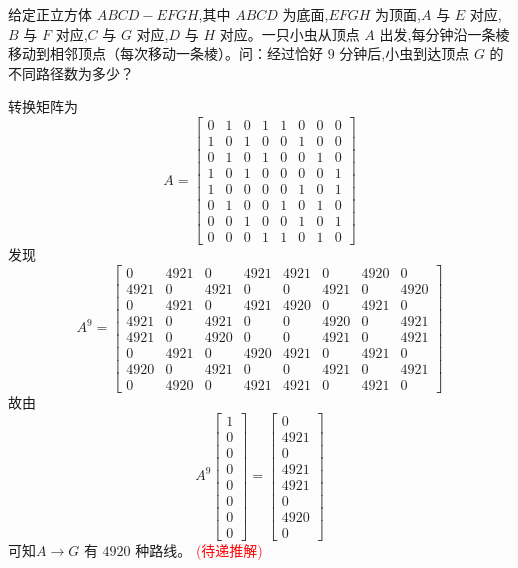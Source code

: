 \begin{questions}
    \question 给定正立方体 $ABCD-EFGH$,其中 $ABCD$ 为底面,$EFGH$ 为顶面,$A$ 与 $E$ 对应,$B$ 与 $F$ 对应,$C$ 与 $G$ 对应,$D$ 与 $H$ 对应。一只小虫从顶点 $A$ 出发,每分钟沿一条棱移动到相邻顶点（每次移动一条棱）。问：经过恰好 $9$ 分钟后,小虫到达顶点 $G$ 的不同路径数为多少？
    \begin{solution}
        转换矩阵为
        \[
        A=
        \begin{bmatrix}
        0 & 1 & 0 & 1 & 1 & 0 & 0 & 0 \\
        1 & 0 & 1 & 0 & 0 & 1 & 0 & 0 \\
        0 & 1 & 0 & 1 & 0 & 0 & 1 & 0 \\
        1 & 0 & 1 & 0 & 0 & 0 & 0 & 1 \\
        1 & 0 & 0 & 0 & 0 & 1 & 0 & 1 \\
        0 & 1 & 0 & 0 & 1 & 0 & 1 & 0 \\
        0 & 0 & 1 & 0 & 0 & 1 & 0 & 1 \\
        0 & 0 & 0 & 1 & 1 & 0 & 1 & 0
        \end{bmatrix}
        \]
        发现
        \[
        A^9=
        \begin{bmatrix}
        0 & 4921 & 0 & 4921 & 4921 & 0 & 4920 & 0 \\
        4921 & 0 & 4921 & 0 & 0 & 4921 & 0 & 4920 \\
        0 & 4921 & 0 & 4921 & 4920 & 0 & 4921 & 0 \\
        4921 & 0 & 4921 & 0 & 0 & 4920 & 0 & 4921 \\
        4921 & 0 & 4920 & 0 & 0 & 4921 & 0 & 4921 \\
        0 & 4921 & 0 & 4920 & 4921 & 0 & 4921 & 0 \\
        4920 & 0 & 4921 & 0 & 0 & 4921 & 0 & 4921 \\
        0 & 4920 & 0 & 4921 & 4921 & 0 & 4921 & 0
        \end{bmatrix}
        \]
        故由
        \[
        A^9
        \begin{bmatrix}
        1 \\ 0 \\ 0 \\ 0 \\ 0 \\ 0 \\ 0 \\ 0
        \end{bmatrix}
        =
        \begin{bmatrix}
        0 \\ 4921 \\ 0 \\ 4921 \\ 4921 \\ 0 \\ 4920 \\ 0
        \end{bmatrix}
        \]
        可知$A \to G$ 有 $4920$ 种路线。
        \textcolor{red}{(待递推解)}
    \end{solution}


\end{questions}
